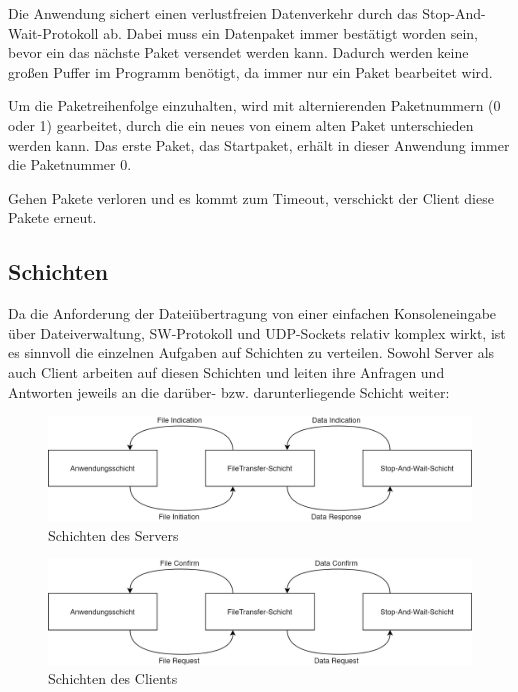 \documentclass{article}
\begin{document}
		Die Anwendung sichert einen verlustfreien Datenverkehr durch das Stop-And-Wait-Protokoll ab. Dabei muss ein Datenpaket immer bestätigt worden sein, bevor ein das nächste Paket versendet werden kann. Dadurch werden keine großen Puffer im Programm benötigt, da immer nur ein Paket bearbeitet wird. 

		Um die Paketreihenfolge einzuhalten, wird mit alternierenden Paketnummern (0 oder 1) gearbeitet, durch die ein neues von einem alten Paket unterschieden werden kann. Das erste Paket, das Startpaket, erhält in dieser Anwendung immer die Paketnummer 0.

		Gehen Pakete verloren und es kommt zum Timeout, verschickt der Client diese Pakete erneut.

		\subsection{Schichten}

		Da die Anforderung der Dateiübertragung von einer einfachen Konsoleneingabe über Dateiverwaltung, SW-Protokoll und UDP-Sockets relativ komplex wirkt, ist es sinnvoll die einzelnen Aufgaben auf Schichten zu verteilen. Sowohl Server als auch Client arbeiten auf diesen Schichten und leiten ihre Anfragen und Antworten jeweils an die darüber- bzw. darunterliegende Schicht weiter:

		\begin{figure}[!htb]
			\centering
			\includegraphics[scale=0.2]{schema_schichten_server.png}
			\caption{Schichten des Servers}
		\end{figure}

		\begin{figure}[!htb]
			\centering
			\includegraphics[scale=0.2]{schema_schichten_client.png}
			\caption{Schichten des Clients}
		\end{figure}
\end{document}
